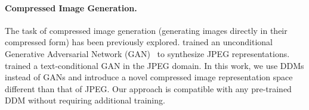 \paragraph{Compressed Image Generation.}The task of compressed image generation (generating images directly in their compressed form) has been previously explored. \citet{kang2019jointimagegenerationcompression} trained an unconditional Generative Adversarial Network (GAN)~\citep{NIPS2014_5ca3e9b1} to synthesize JPEG representations. \citet{bulla2023} trained a text-conditional GAN in the JPEG domain.
In this work, we use DDMs instead of GANs and introduce a novel compressed image representation space different than that of JPEG. Our approach is compatible with any pre-trained DDM without requiring additional training.